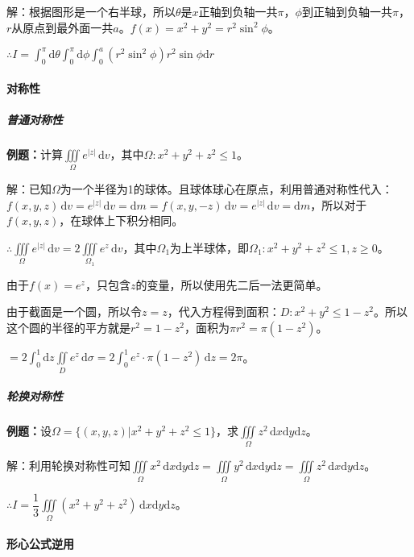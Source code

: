 \documentclass[UTF8, 12pt]{ctexart}
\begin{document}
        解：根据图形是一个右半球，所以$\theta$是$x$正轴到负轴一共$\pi$，$\phi$到正轴到负轴一共$\pi$，$r$从原点到最外面一共$a$。$f(x)=x^2+y^2=r^2\sin^2\phi$。

        $\therefore I=\int_0^\pi\textrm{d}\theta\int_0^\pi\textrm{d}\phi\int_0^a(r^2\sin^2\phi)r^2\sin\phi\textrm{d}r$

        \paragraph{对称性} \leavevmode \medskip

        \subparagraph{普通对称性} \leavevmode \medskip

        \textbf{例题：}计算$\iiint\limits_\Omega e^{\vert z\vert}\,\textrm{d}v$，其中$\Omega:x^2+y^2+z^2\leqslant1$。

        解：已知$\Omega$为一个半径为1的球体。且球体球心在原点，利用普通对称性代入：$f(x,y,z)\,\textrm{d}v=e^{\vert z\vert}\,\textrm{d}v=\textrm{d}m=f(x,y,-z)\,\textrm{d}v=e^{\vert z\vert}\,\textrm{d}v=\textrm{d}m$，所以对于$f(x,y,z)$，在球体上下积分相同。

        $\therefore\iiint\limits_\Omega e^{\vert z\vert}\,\textrm{d}v=2\iiint\limits_{\Omega_1}e^z\,\textrm{d}v$，其中$\Omega_1$为上半球体，即$\Omega_1:x^2+y^2+z^2\leqslant1,z\geqslant0$。

        由于$f(x)=e^z$，只包含$z$的变量，所以使用先二后一法更简单。

        由于截面是一个圆，所以令$z=z$，代入方程得到面积：$D:x^2+y^2\leqslant1-z^2$。所以这个圆的半径的平方就是$r^2=1-z^2$，面积为$\pi r^2=\pi(1-z^2)$。

        $=2\int_0^1\textrm{d}z\iint\limits_De^z\,\textrm{d}\sigma=2\int_0^1e^z\cdot\pi(1-z^2)\,\textrm{d}z=2\pi$。

        \subparagraph{轮换对称性} \leavevmode \medskip

        \textbf{例题：}设$\Omega=\{(x,y,z)|x^2+y^2+z^2\leqslant1\}$，求$\iiint\limits_\Omega z^2\,\textrm{d}x\textrm{d}y\textrm{d}z$。

        解：利用轮换对称性可知$\iiint\limits_\Omega x^2\,\textrm{d}x\textrm{d}y\textrm{d}z=\iiint\limits_\Omega y^2\,\textrm{d}x\textrm{d}y\textrm{d}z=\iiint\limits_\Omega z^2\,\textrm{d}x\textrm{d}y\textrm{d}z$。

        $\therefore I=\dfrac{1}{3}\iiint\limits_\Omega(x^2+y^2+z^2)\,\textrm{d}x\textrm{d}y\textrm{d}z$。

        \paragraph{形心公式逆用} \leavevmode \medskip
\end{document}
